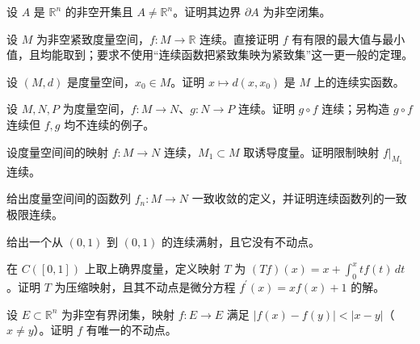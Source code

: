 \noindent\begin{minipage}{\textwidth}
设 $A$ 是 $\mathbb R^n$ 的非空开集且 $A\ne\mathbb R^n$。证明其边界 $\partial A$ 为非空闭集。
\end{minipage}\par\vfill
\noindent\begin{minipage}{\textwidth}
设 $M$ 为非空紧致度量空间，$f:M\to\mathbb R$ 连续。直接证明 $f$ 有有限的最大值与最小值，且均能取到；要求不使用“连续函数把紧致集映为紧致集”这一更一般的定理。
\end{minipage}\par\vfill
\noindent\begin{minipage}{\textwidth}
设 $(M,d)$ 是度量空间，$x_0\in M$。证明 $x\mapsto d(x,x_0)$ 是 $M$ 上的连续实函数。
\end{minipage}\par\vfill
\newpage
\noindent\begin{minipage}{\textwidth}
设 $M,N,P$ 为度量空间，$f:M\to N$、$g:N\to P$ 连续。证明 $g\circ f$ 连续；另构造 $g\circ f$ 连续但 $f,g$ 均不连续的例子。
\end{minipage}\par\vfill
\noindent\begin{minipage}{\textwidth}
设度量空间间的映射 $f:M\to N$ 连续，$M_1\subset M$ 取诱导度量。证明限制映射 $f|_{M_1}$ 连续。
\end{minipage}\par\vfill
\noindent\begin{minipage}{\textwidth}
给出度量空间间的函数列 $f_n:M\to N$ 一致收敛的定义，并证明连续函数列的一致极限连续。
\end{minipage}\par\vfill
\noindent\begin{minipage}{\textwidth}
给出一个从 $(0,1)$ 到 $(0,1)$ 的连续满射，且它没有不动点。
\end{minipage}\par\vfill
\newpage
\noindent\begin{minipage}{\textwidth}
在 $C([0,1])$ 上取上确界度量，定义映射 $T$ 为 $\displaystyle(Tf)(x)=x+\int_0^x t f(t)\,dt$。证明 $T$ 为压缩映射，且其不动点是微分方程 $f^{\prime}(x)=xf(x)+1$ 的解。
\end{minipage}\par\vfill
\noindent\begin{minipage}{\textwidth}
设 $E\subset\mathbb R^n$ 为非空有界闭集，映射 $f:E\to E$ 满足 $|f(x)-f(y)|<|x-y|$（$x\ne y$）。证明 $f$ 有唯一的不动点。
\end{minipage}\par\vfill
